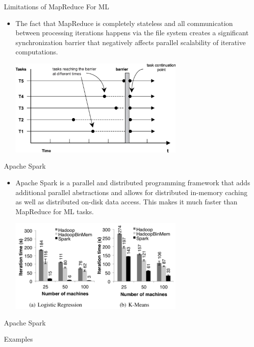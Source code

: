 \documentclass[serif,xcolor=pdftex,dvipsnames,table,hyperref={bookmarks=false,breaklinks}]{beamer}
\begin{document}
\begin{frame}[t]{Limitations of MapReduce For ML}
\begin{itemize}

\item The fact that MapReduce is completely stateless and all 
communication between processing iterations happens via the file system creates 
a significant synchronization barrier that negatively affects parallel 
scalability of iterative computations.

\pause
\center
\includegraphics[width=3.4in]{../Figures/synchronization_barrier.jpg}\\

\end{itemize}
\end{frame}

\begin{frame}[t]{Apache Spark}
\begin{itemize}

\item Apache Spark is a parallel and distributed programming framework that 
adds additional parallel abstractions and allows for distributed 
in-memory caching as well as distributed on-disk data access. This makes it 
much faster than MapReduce for ML tasks.

\pause
\center
\includegraphics[width=3.4in]{../Figures/spark_vs_hadoop.png}\\
\end{itemize}

\end{frame}


\begin{frame}[t]{Apache Spark}

\center
\Huge Examples

\end{frame}
\end{document}
